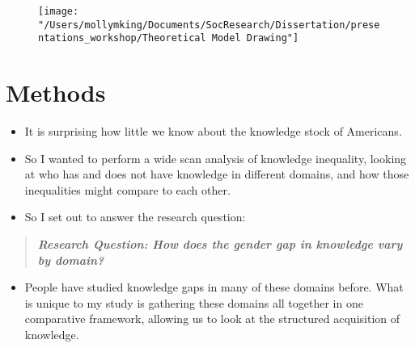 \documentclass[]{article}
\begin{document}


    \begin{figure}[htb]
      \begin{center}
        \texttt{[image: "/Users/mollymking/Documents/SocResearch/Dissertation/presentations\_workshop/Theoretical Model Drawing"]}
      \end{center}
    \end{figure}

\newpage

\section{Methods}\label{methods}



\begin{itemize}
   \item{It is surprising how little we know about the knowledge stock of Americans.}
   \item{So I wanted to perform a wide scan analysis of knowledge inequality, looking at who has and does not have knowledge in different domains, and how those inequalities might compare to each other.}
  \item{So I set out to answer the research question:}
\end{itemize}

\begin{quote}
  \emph{\textbf{Research Question: How does the gender gap in knowledge vary by domain?}}
\end{quote}

\vspace{5mm}

\begin{itemize}
  \item{People have studied knowledge gaps in many of these domains before. What is unique to my study is gathering these domains all together in one comparative framework, allowing us to look at the structured acquisition of knowledge.}
\end{itemize}
\end{document}
